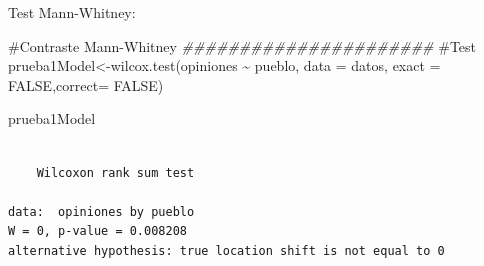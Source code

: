 \documentclass[
  ignorenonframetext,
]{beamer}
\newenvironment{Shaded}{\begin{snugshade}}{\end{snugshade}}
\newcommand{\AttributeTok}[1]{\textcolor[rgb]{0.40,0.45,0.13}{#1}}
\newcommand{\CommentTok}[1]{\textcolor[rgb]{0.37,0.37,0.37}{#1}}
\newcommand{\ConstantTok}[1]{\textcolor[rgb]{0.56,0.35,0.01}{#1}}
\newcommand{\DocumentationTok}[1]{\textcolor[rgb]{0.37,0.37,0.37}{\textit{#1}}}
\newcommand{\FunctionTok}[1]{\textcolor[rgb]{0.28,0.35,0.67}{#1}}
\newcommand{\NormalTok}[1]{\textcolor[rgb]{0.00,0.23,0.31}{#1}}
\newcommand{\OtherTok}[1]{\textcolor[rgb]{0.00,0.23,0.31}{#1}}
\newcommand{\SpecialCharTok}[1]{\textcolor[rgb]{0.37,0.37,0.37}{#1}}
\begin{document}
\begin{frame}[fragile]
\begin{block}{Test Mann-Whitney:}
\label{test-mann-whitney}
\begin{Shaded}
\begin{Highlighting}[]
\CommentTok{\#Contraste Mann{-}Whitney}
\DocumentationTok{\#\#\#\#\#\#\#\#\#\#\#\#\#\#\#\#\#\#\#\#\#\#}
\CommentTok{\#Test}
\NormalTok{prueba1Model}\OtherTok{\textless{}{-}}\FunctionTok{wilcox.test}\NormalTok{(opiniones }\SpecialCharTok{\textasciitilde{}}\NormalTok{ pueblo, }\AttributeTok{data =}\NormalTok{ datos, }\AttributeTok{exact =} \ConstantTok{FALSE}\NormalTok{,}\AttributeTok{correct=} \ConstantTok{FALSE}\NormalTok{)}

\NormalTok{prueba1Model}
\end{Highlighting}
\end{Shaded}

\begin{verbatim}

    Wilcoxon rank sum test

data:  opiniones by pueblo
W = 0, p-value = 0.008208
alternative hypothesis: true location shift is not equal to 0
\end{verbatim}

\begin{Shaded}
\end{Shaded}
\end{block}
\end{frame}
\end{document}
